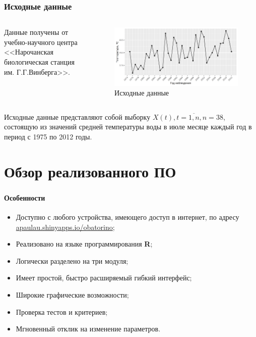 \documentclass[notheorems]{beamer}
\theoremstyle{definition}
\theoremstyle{example}
\theoremstyle{plain}
\begin{document}
\begin{frame}
  \frametitle{Исходные данные}
  \begin{columns}[c]
  Данные получены от учебно-научного центра <<Нарочанская биологическая станция им. Г.Г.Винберга>>.

  \begin{figure}[h]
    \includegraphics[width=1\linewidth]{../../figures/source.png}
    \caption{Исходные данные}
  \end{figure}
  \end{columns}
  
  \vspace{1em}
  
  Исходные данные представляют собой выборку $ X(t), t = \overline{1,n}, n = 38 $, состоящую из значений средней температуры воды в июле месяце каждый год в период с 1975 по 2012 годы.
\end{frame}

\section{Обзор реализованного ПО}

\begin{frame}
  \frametitle{\large\secname}
  \framesubtitle{Особенности}
  \begin{itemize}
    \item Доступно с любого устройства, имеющего доступ в интернет, по адресу \href{https://apaulau.shinyapps.io/obatorino}{apaulau.shinyapps.io/obatorino};
    \item Реализовано на языке программирования \textbf{R};
    \item Логически разделено на три модуля;
    \item Имеет простой, быстро расширяемый гибкий интерфейс;
    \item Широкие графические возможности;
    \item Проверка тестов и критериев;
    \item Мгновенный отклик на изменение параметров.
  \end{itemize}
\end{frame}
\end{document}
